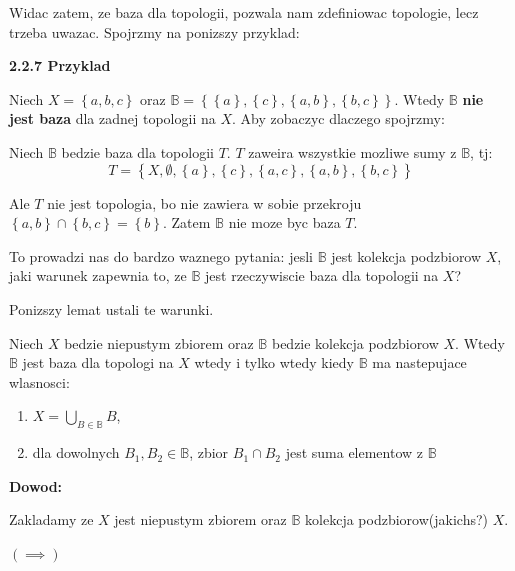 \documentclass{article}
\begin{document}
Widac zatem, ze baza dla topologii, pozwala nam zdefiniowac topologie, lecz trzeba uwazac. Spojrzmy na ponizszy przyklad:

\textbf{2.2.7 Przyklad}

Niech $X = \left\{ a,b,c \right\}$ oraz $\mathbb{B} = \left\{ \left\{ a \right\}, \left\{ c \right\}, \left\{ a,b \right\}, \left\{ b,c \right\}  \right\}$. Wtedy $\mathbb{B}$ \textbf{nie jest baza} dla zadnej topologii na $X$. Aby zobaczyc dlaczego spojrzmy:

Niech $\mathbb{B}$ bedzie baza dla topologii $T$. $T$ zaweira wszystkie mozliwe sumy z $\mathbb{B}$, tj:
$$T = \left\{X, \emptyset, \left\{ a \right\}, \left\{ c \right\}, \left\{ a,c \right\}, \left\{ a,b \right\}, \left\{ b,c \right\}    \right\}$$

Ale $T$ nie jest topologia, bo nie zawiera w sobie przekroju $\left\{ a,b \right\} \cap \left\{ b,c \right\} = \left\{ b \right\}$. Zatem $\mathbb{B}$ nie moze byc baza $T$.
\vspace{1cm}

To prowadzi nas do bardzo waznego pytania: jesli $\mathbb{B}$ jest kolekcja podzbiorow $X$, jaki warunek zapewnia to, ze $\mathbb{B}$ jest rzeczywiscie baza dla topologii na $X$?

Ponizszy lemat ustali te warunki.

\begin{tcolorbox}[colback=white!90!green,colframe=black!35!green,title=2.2.8 Lemat: Warunek na bycie baza]

    Niech $X$ bedzie niepustym zbiorem oraz $\mathbb{B}$ bedzie kolekcja podzbiorow $X$. Wtedy $\mathbb{B}$ jest baza dla topologi na $X$ wtedy i tylko wtedy kiedy $\mathbb{B}$ ma nastepujace wlasnosci:

    \begin{enumerate}[label=(\alph*)]
        \item $X = \bigcup\limits_{B \in \mathbb{B}}B$,
        \item dla dowolnych $B_{1}, B_{2} \in \mathbb{B}$, zbior $B_{1} \cap B_{2}$ jest suma elementow z $\mathbb{B}$

    \end{enumerate}

\end{tcolorbox}

\textbf{Dowod:}

Zakladamy ze $X$ jest niepustym zbiorem oraz $\mathbb{B}$ kolekcja podzbiorow(jakichs?) $X$.

$(\implies)$
\end{document}
